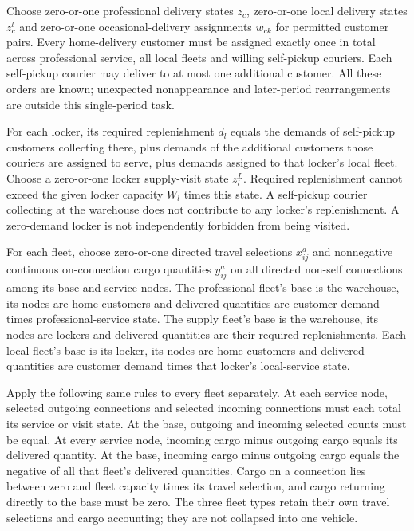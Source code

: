 \documentclass[10pt]{article}
\begin{document}
Choose zero-or-one professional delivery states $z_c$, zero-or-one local delivery states $z_c^l$ and zero-or-one occasional-delivery assignments $w_{ck}$ for permitted customer pairs. Every home-delivery customer must be assigned exactly once in total across professional service, all local fleets and willing self-pickup couriers. Each self-pickup courier may deliver to at most one additional customer. All these orders are known; unexpected nonappearance and later-period rearrangements are outside this single-period task.

For each locker, its required replenishment $d_l$ equals the demands of self-pickup customers collecting there, plus demands of the additional customers those couriers are assigned to serve, plus demands assigned to that locker's local fleet. Choose a zero-or-one locker supply-visit state $z_l^L$. Required replenishment cannot exceed the given locker capacity $W_l$ times this state. A self-pickup courier collecting at the warehouse does not contribute to any locker's replenishment. A zero-demand locker is not independently forbidden from being visited.

For each fleet, choose zero-or-one directed travel selections $x^a_{ij}$ and nonnegative continuous on-connection cargo quantities $y^a_{ij}$ on all directed non-self connections among its base and service nodes. The professional fleet's base is the warehouse, its nodes are home customers and delivered quantities are customer demand times professional-service state. The supply fleet's base is the warehouse, its nodes are lockers and delivered quantities are their required replenishments. Each local fleet's base is its locker, its nodes are home customers and delivered quantities are customer demand times that locker's local-service state.

Apply the following same rules to every fleet separately. At each service node, selected outgoing connections and selected incoming connections must each total its service or visit state. At the base, outgoing and incoming selected counts must be equal. At every service node, incoming cargo minus outgoing cargo equals its delivered quantity. At the base, incoming cargo minus outgoing cargo equals the negative of all that fleet's delivered quantities. Cargo on a connection lies between zero and fleet capacity times its travel selection, and cargo returning directly to the base must be zero. The three fleet types retain their own travel selections and cargo accounting; they are not collapsed into one vehicle.
\end{document}
